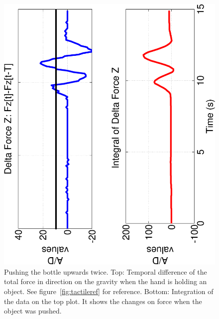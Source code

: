 \begin{figure}[htbp]
\centerline{
\includegraphics[height=\columnwidth, angle=270 ]{./figures/2TapsX.eps}
} \caption[Pushing the bottle upwards twice]{Pushing the bottle
upwards twice. Top: Temporal difference of the total force in
direction on the gravity when the hand is holding an object. See
figure~\ref{fig:tactileref} for reference. Bottom: Integration of
the data on the top plot. It shows the changes on force when the
object was pushed.} \label{fig:twotaps}
\end{figure}

